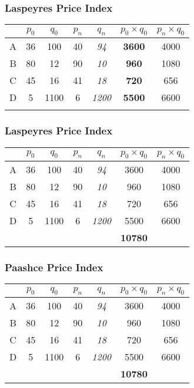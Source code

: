 \documentclass{beamer}
\begin{document}
\begin{frame}
\frametitle{Laspeyres Price Index}
\begin{center}
\LARGE
\begin{tabular}{|c||c|c||c|c||c|c|}
\hline  &\phantom{s}$p_0$\phantom{s}	&	$q_0$	&	$p_n$	&	$q_n$	&	$p_0 \times q_0$	&	$p_n \times q_0$	\\	\hline
A & 36	&	100	&	40	&	\textit{94}	&	\textbf{3600}	&	4000	\\	\hline
B & 80	&	12	&	90	&	\textit{10}	&	\textbf{960}	&	1080	\\	\hline
C & 45	&	16	&	41	&	\textit{18}	&	\textbf{720}	&	656	\\	\hline
D & 5	&	1100	&	6	&	\textit{1200}	&	\textbf{5500}	&	6600	\\	\hline
& 	&		&		&		&	 \textbf{{\color{red}{10780}}}	& \phantom{12336}		\\	\hline
\end{tabular} 
\end{center}
\end{frame}


\begin{frame}
\frametitle{Laspeyres Price Index}
\begin{center}
\LARGE
\begin{tabular}{|c||c|c||c|c||c|c|}
\hline  &\phantom{s}$p_0$\phantom{s}	&	$q_0$	&	$p_n$	&	$q_n$	&	$p_0 \times q_0$	&	$p_n \times q_0$	\\	\hline
A & 36	&	100	&	40	&	\textit{94}	&	3600	&	4000	\\	\hline
B & 80	&	12	&	90	&	\textit{10}	&	960	&	1080	\\	\hline
C & 45	&	16	&	41	&	\textit{18}	&	720	&	656	\\	\hline
D & 5	&	1100	&	6	&	\textit{1200}	&	5500	&	6600	\\	\hline
& 	&		&		&		&	\textbf{10780}	& \phantom{12336}		\\	\hline
\end{tabular} 
\end{center}
\end{frame}


\begin{frame}
\frametitle{Paashce Price Index}
\begin{center}
\LARGE
\begin{tabular}{|c||c|c||c|c||c|c|}
\hline  &\phantom{s}$p_0$\phantom{s}	&	$q_0$	&	$p_n$	&	$q_n$	&	$p_0 \times q_0$	&	$p_n \times q_0$	\\	\hline
A & 36	&	100	&	40	&	\textit{94}	&	3600	&	4000	\\	\hline
B & 80	&	12	&	90	&	\textit{10}	&	960	&	1080	\\	\hline
C & 45	&	16	&	41	&	\textit{18}	&	720	&	656	\\	\hline
D & 5	&	1100	&	6	&	\textit{1200}	&	5500	&	6600	\\	\hline
& 	&		&		&		&	\textbf{10780}	& \phantom{12336}		\\	\hline
\end{tabular} 
\end{center}
\end{frame}
\end{document}
